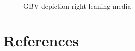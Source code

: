 \documentclass{article}
\begin{document}
{\begin{figure}[H]
	\caption{\label{fig:my-label1} GBV depiction right leaning media}
\end{figure}

}




\section{References}\label{sec_ref}
\end{document}
